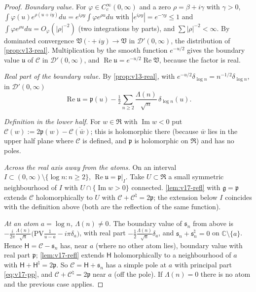 \documentclass[11pt,a4paper]{article}
\numberwithin{equation}{section}
\theoremstyle{definition}
\theoremstyle{remark}
\begin{document}
\begin{proof}
\emph{Boundary value.} For $\varphi\in C_c^\infty(0,\infty)$ and a zero $\rho=\beta+i\gamma$ with $\gamma>0$, $\int\varphi(u)e^{\rho(u+iy)}du=e^{i\rho y}\int\varphi e^{\rho u}du$ with $|e^{i\rho y}|=e^{-\gamma y}\le1$ and $\int\varphi e^{\rho u}du=O_\varphi(|\rho|^{-2})$ (two integrations by parts), and $\sum|\rho|^{-2}<\infty$. By dominated convergence $\mathfrak V(\cdot+iy)\to\mathfrak V$ in $\mathcal D'(0,\infty)$, the distribution of \cref{prop:v13-real}. Multiplication by the smooth function $e^{-u/2}$ gives the boundary value $\mathfrak u$ of $\mathscr C$ in $\mathcal D'(0,\infty)$, and $\operatorname{Re}\mathfrak u=e^{-u/2}\operatorname{Re}\mathfrak V$, because the factor is real.

\emph{Real part of the boundary value.} By \cref{prop:v13-real}, with $e^{-u/2}\delta_{\log n}=n^{-1/2}\delta_{\log n}$, in $\mathcal D'(0,\infty)$
\begin{equation}
\operatorname{Re}\mathfrak u=\mathfrak p(u)-\tfrac12\sum_{n\ge2}\frac{\Lambda(n)}{\sqrt n}\,\delta_{\log n}(u).
\end{equation}

\emph{Definition in the lower half.} For $w\in\mathfrak R$ with $\operatorname{Im}w<0$ put $\mathscr C(w):=2\mathfrak p(w)-\overline{\mathscr C(\bar w)}$; this is holomorphic there (because $\bar w$ lies in the upper half plane where $\mathscr C$ is defined, and $\mathfrak p$ is holomorphic on $\mathfrak R$) and has no poles.

\emph{Across the real axis away from the atoms.} On an interval $I\subset(0,\infty)\setminus\{\log n:n\ge2\}$, $\operatorname{Re}\mathfrak u=\mathfrak p|_I$. Take $U\subset\mathfrak R$ a small symmetric neighbourhood of $I$ with $U\cap\{\operatorname{Im}w>0\}$ connected. \cref{lem:v17-refl} with $\mathfrak g=\mathfrak p$ extends $\mathscr C$ holomorphically to $U$ with $\mathscr C+\mathscr C^\natural=2\mathfrak p$; the extension below $I$ coincides with the definition above (both are the reflection of the same function). 

\emph{At an atom $a=\log n$, $\Lambda(n)\ne0$.} The boundary value of $\mathfrak s_n$ from above is $-\frac{i}{2\pi}\frac{\Lambda(n)}{\sqrt n}\bigl(\mathrm{PV}\frac1{u-a}-i\pi\delta_a\bigr)$, with real part $-\frac12\frac{\Lambda(n)}{\sqrt n}\delta_a$, and $\mathfrak s_n+\mathfrak s_n^\natural=0$ on $\mathbb C\setminus\{a\}$. Hence $\mathsf H=\mathscr C-\mathfrak s_n$ has, near $a$ (where no other atom lies), boundary value with real part $\mathfrak p$; \cref{lem:v17-refl} extends $\mathsf H$ holomorphically to a neighbourhood of $a$ with $\mathsf H+\mathsf H^\natural=2\mathfrak p$. So $\mathscr C=\mathsf H+\mathfrak s_n$ has a simple pole at $a$ with principal part \eqref{eq:v17-pp}, and $\mathscr C+\mathscr C^\natural=2\mathfrak p$ near $a$ (off the pole). If $\Lambda(n)=0$ there is no atom and the previous case applies.


\end{proof}
\end{document}
